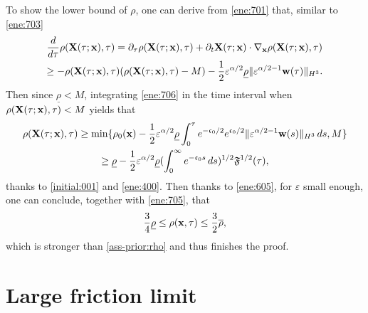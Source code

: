 \documentclass[11pt]{article}
\theoremstyle{plain}
\theoremstyle{definition}
\theoremstyle{remark}
\newcommand{\dt}{\partial_t}
\renewcommand{\vec}[1]{{\bf #1}}
\newcommand{\norm}[2]{\Vert #1 \Vert_{#2}}
\numberwithin{equation}{section}
\begin{document}
To show the lower bound of $ \rho $, one can derive from \eqref{ene:701} that, similar to \eqref{ene:703}
\begin{equation}
    \label{ene:706}
    \begin{gathered}
        \dfrac{d}{d\tau} \rho(\vec X(\tau; \vec x), \tau ) = \partial_\tau \rho (\vec X(\tau; \vec x), \tau ) + \dt \vec X(\tau;\vec x) \cdot \nabla_{\vec x} \rho (\vec X(\tau; \vec x), \tau ) \\
        \geq - \rho (\vec X(\tau; \vec x), \tau ) (\rho (\vec X(\tau; \vec x), \tau ) - M) - \frac{1}{2}\varepsilon^{\alpha/2} \underline \rho\norm{\varepsilon^{\alpha/2-1}\vec w(\tau)}{H^3}.
    \end{gathered}
\end{equation}
Then since $ \underline \rho < M $, integrating \eqref{ene:706} in the time interval when $ \rho(\vec X(\tau;\vec x),\tau) < M $ yields that 
\begin{equation}
    \label{ene:707}
    \begin{gathered}
        \rho(\vec X(\tau;\vec x),\tau) \geq \min\lbrace \rho_0(\vec x) - \frac{1}{2} \varepsilon^{\alpha/2} \underline\rho \int_0^\tau  e^{-\mathfrak c_0/2} e^{\mathfrak c_0/2} \norm{\varepsilon^{\alpha/2-1}\vec w(s)}{H^3} \,ds, M \rbrace \\
    \geq \underline \rho - \frac{1}{2} \varepsilon^{\alpha/2} \underline \rho  (\int_0^\infty e^{-\mathfrak c_0s}\,ds)^{1/2} \mathfrak F^{1/2}(\tau),
    \end{gathered}
\end{equation}
thanks to \eqref{initial:001} and \eqref{ene:400}.
Then thanks to \eqref{ene:605}, for $ \varepsilon $ small enough, one can conclude, together with \eqref{ene:705}, that
\begin{equation}
    \label{ene:708}
    \frac{3}{4} \underline \rho \leq \rho(\vec x, \tau) \leq \frac{3}{2} \overline \rho, 
\end{equation}
which is stronger than \eqref{ass-prior:rho} and thus finishes the proof. 


\section{Large friction limit}
\label{sec:convergence}
\end{document}
